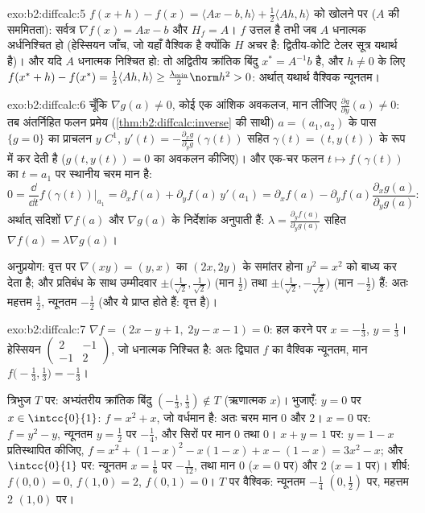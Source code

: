 \begin{solution}{exo:b2:diffcalc:5}
$f(x + h) - f(x) = \langle Ax - b, h\rangle +
\frac12\langle Ah, h\rangle$ को खोलने पर ($A$ की सममितता): सर्वत्र $\nabla f(x) = Ax -
b$ और $H_f = A$। $f$ उत्तल है तभी जब
$A$ धनात्मक अर्धनिश्चित हो (हेस्सियन जाँच, जो यहाँ वैश्विक है क्योंकि $H$
अचर है: द्वितीय-कोटि टेलर सूत्र यथार्थ है)। और यदि $A$ धनात्मक निश्चित हो:
तो अद्वितीय क्रांतिक बिंदु $x^* = A^{-1}b$ है, और $h \neq 0$ के लिए $f(x^*
+ h) - f(x^*) = \frac12\langle Ah, h\rangle \geq
\frac{\lambda_{\min}}{2}\norm h^2 > 0$: अर्थात् यथार्थ
वैश्विक न्यूनतम।
\end{solution}

\begin{solution}{exo:b2:diffcalc:6}
चूँकि $\nabla g(a) \neq 0$, कोई एक आंशिक अवकलज, मान लीजिए $\frac{\partial
g}{\partial y}(a) \neq 0$: तब अंतर्निहित फलन प्रमेय
(\cref{thm:b2:diffcalc:inverse} की साथी) $a = (a_1, a_2)$ के पास $\{g =
0\}$ का प्राचलन $y$ $C^1$, $y'(t) = -\frac{\partial_x g}{\partial_y g}(\gamma(t))$ सहित $\gamma(t) = (t, y(t))$ के रूप में
कर देती है ($g(t, y(t)) = 0$ का अवकलन कीजिए)। और एक-चर फलन $t
\mapsto f(\gamma(t))$ का $t = a_1$ पर स्थानीय चरम
मान है:
\[
0 = \frac{\dd}{\dd t}f(\gamma(t))\Big|_{a_1}
= \partial_x f(a) + \partial_y f(a)\,y'(a_1)
= \partial_x f(a) - \partial_yf(a)\frac{\partial_x
g(a)}{\partial_y g(a)} :
\]
अर्थात् सदिशों $\nabla f(a)$ और $\nabla g(a)$ के निर्देशांक अनुपाती हैं: $\lambda =
\frac{\partial_y f(a)}{\partial_y g(a)}$ सहित $\nabla f(a) = \lambda \nabla g(a)$।

अनुप्रयोग: वृत्त पर $\nabla(xy) = (y, x)$ का $(2x, 2y)$ के समांतर होना $y^2 = x^2$ को बाध्य कर देता है; और
प्रतिबंध के साथ उम्मीदवार $\pm\bigl(\tfrac{1}{\sqrt2}, \tfrac{1}{\sqrt2}\bigr)$ (मान $\frac12$) तथा $\pm\bigl(\tfrac{1}{\sqrt2},
-\tfrac{1}{\sqrt2}\bigr)$ (मान $-\frac12$) हैं: अतः महत्तम
$\frac12$, न्यूनतम $-\frac12$ (और ये प्राप्त होते हैं: वृत्त  है)।
\end{solution}

\begin{solution}{exo:b2:diffcalc:7}
$\nabla f = (2x - y + 1,\; 2y - x - 1) = 0$: हल करने पर $x =
-\frac13$, $y = \frac13$। हेस्सियन $\begin{pmatrix} 2 & -1\\ -1 &
2\end{pmatrix}$, जो धनात्मक निश्चित है: अतः
द्विघात $f$ का वैश्विक न्यूनतम, मान $f\bigl(-\frac13, \frac13\bigr) = -\frac13$।

त्रिभुज $T$ पर: अभ्यंतरीय क्रांतिक बिंदु $(-\frac13,
\frac13) \notin T$ (ऋणात्मक $x$)। भुजाएँ: $y = 0$
पर $x \in
\intcc{0}{1}$: $f = x^2 + x$, जो वर्धमान है: अतः चरम मान $0$ और $2$। $x = 0$ पर: $f = y^2 - y$, न्यूनतम
$y = \frac12$ पर $-\frac14$, और सिरों पर मान $0$ तथा $0$। $x + y = 1$ पर: $y = 1 - x$ प्रतिस्थापित
कीजिए, $f = x^2 + (1-x)^2 - x(1-x) + x - (1-x) = 3x^2 - x$; और $\intcc{0}{1}$ पर: न्यूनतम $x = \frac16$ पर $-\frac{1}{12}$, तथा मान $0$ ($x=0$ पर) और
$2$ ($x=1$ पर)। शीर्ष: $f(0,0) = 0$, $f(1,0)
= 2$, $f(0,1) = 0$। $T$ पर वैश्विक: न्यूनतम $-\frac14$
$(0,
\frac12)$ पर, महत्तम $2$ $(1, 0)$ पर।
\end{solution}

